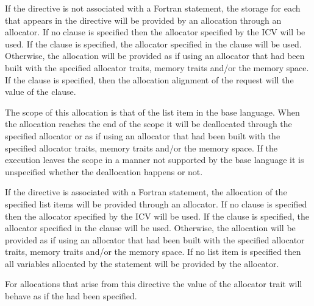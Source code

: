 If the directive is not associated with a Fortran  statement, the storage for each  that appears in the directive will be provided by an allocation through an allocator. If no clause is specified then the allocator specified by the  ICV will be used. If the  clause is specified, the allocator specified in the clause will be used. Otherwise, the allocation will be provided as if using an allocator that had been built with the specified allocator traits, memory traits and/or the  memory space. If the  clause is specified, then the allocation alignment of the request will the value of the  clause.

The scope of this allocation is that of the list item in the base language. When the allocation reaches the end of the scope it will be deallocated through the specified allocator or as if using an allocator that had been built with the specified allocator traits, memory traits and/or the  memory space. If the execution leaves the scope in a manner not supported by the base language it is unspecified whether the deallocation happens or not.

\fortranspecificstart
If the directive is associated with a Fortran  statement, the allocation of the specified list items will be provided through an allocator. If no clause is specified then the allocator specified by the  ICV will be used. If the  clause is specified, the allocator specified in the clause will be used. Otherwise, the allocation will be provided as if using an allocator that had been built with the specified allocator traits, memory traits and/or the  memory space. If no list item is specified then all variables allocated by the  statement will be provided by the allocator.
\fortranspecificend

For allocations that arise from this directive the  value of the  allocator trait will behave as if the  had been specified.

